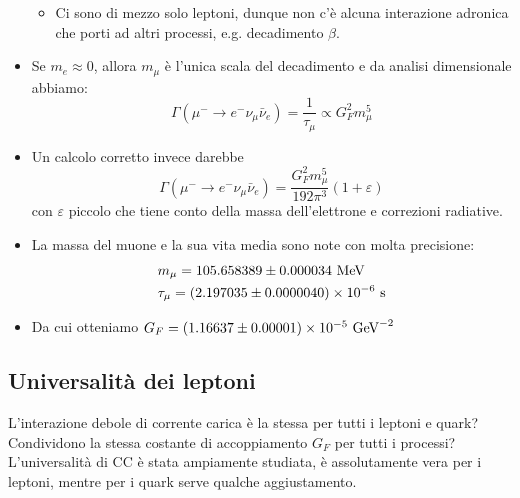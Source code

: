 \begin{itemize}
\begin{itemize}
        \item Ci sono di mezzo solo leptoni, dunque non c'è alcuna interazione adronica che porti ad altri processi, e.g. decadimento $\beta$.
    \end{itemize}
    \item Se $m_e\approx0$, allora $m_\mu$ è l'unica scala del decadimento e da analisi dimensionale abbiamo:
    \begin{equation*}
    \Gamma(\mu^- \to e^- \nu_\mu \bar\nu_e)=\frac{1}{\tau_\mu}\propto G_F^2m_\mu^5
    \end{equation*}
    \item Un calcolo corretto invece darebbe 
    \begin{equation*}
        \Gamma(\mu^- \to e^- \nu_\mu \bar\nu_e)=\frac{G_F^2m_\mu^5}{192\pi^3}(1+\varepsilon)
    \end{equation*}
    con $\varepsilon$ piccolo che tiene conto della massa dell'elettrone e correzioni radiative.
    \item La massa del muone e la sua vita media sono note con molta precisione:
    \begin{align*}
    &m_\mu=105.658389\pm 0.000034\textnormal{ MeV} \\
    &\tau_\mu=(2.197035\pm 0.0000040)\times10^{-6}\textnormal{ s}
    \end{align*}
    \item Da cui otteniamo $G_F=(1.16637\pm0.00001)\times10^{-5}\textnormal{ GeV}^{-2}$
\end{itemize}
\subsection{Universalità dei leptoni}
L'interazione debole di corrente carica è la stessa per tutti i leptoni e quark? Condividono la stessa costante di accoppiamento $G_F$ per tutti i processi?\\
L'universalità di CC è stata ampiamente studiata, è assolutamente vera per i leptoni, mentre per i quark serve qualche aggiustamento. 
